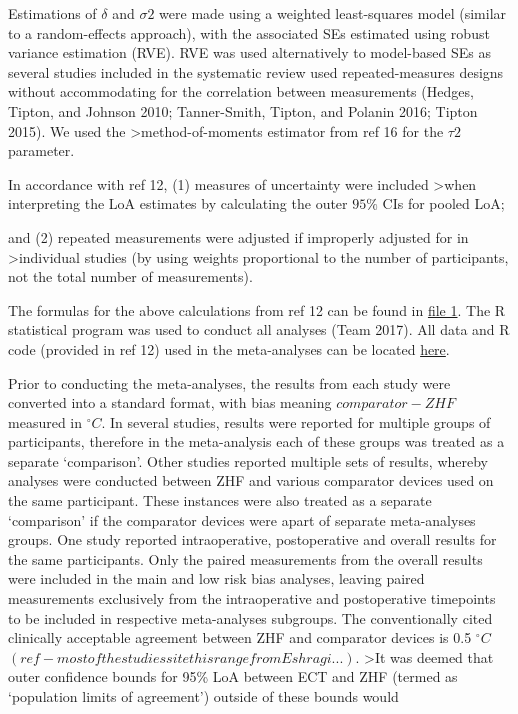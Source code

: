 \documentclass[smallextended]{svjour3}       %
\begin{document}
Estimations of \(\delta\) and \(\sigma2\) were made using a weighted
least-squares model (similar to a random-effects approach), with the
associated SEs estimated using robust variance estimation (RVE). RVE was
used alternatively to model-based SEs as several studies included in the
systematic review used repeated-measures designs without accommodating
for the correlation between measurements (Hedges, Tipton, and Johnson
2010; Tanner-Smith, Tipton, and Polanin 2016; Tipton 2015). We used the
\textgreater{}method-of-moments estimator from ref 16 for the \(\tau2\)
parameter.

In accordance with ref 12, (1) measures of uncertainty were included
\textgreater{}when interpreting the LoA estimates by calculating the
outer \(95\%\) CIs for pooled LoA;

and (2) repeated measurements were adjusted if improperly adjusted for
in \textgreater{}individual studies (by using weights proportional to
the number of participants, not the total number of measurements).

The formulas for the above calculations from ref 12 can be found in
\href{}{file 1}. The R statistical program was used to conduct all
analyses (Team 2017). All data and R code (provided in ref 12) used in
the meta-analyses can be located \href{https://doi.org}{here}.

Prior to conducting the meta-analyses, the results from each study were
converted into a standard format, with bias meaning \(comparator-ZHF\)
measured in \(^\circ C\). In several studies, results were reported for
multiple groups of participants, therefore in the meta-analysis each of
these groups was treated as a separate `comparison'. Other studies
reported multiple sets of results, whereby analyses were conducted
between ZHF and various comparator devices used on the same participant.
These instances were also treated as a separate `comparison' if the
comparator devices were apart of separate meta-analyses groups. One
study reported intraoperative, postoperative and overall results for the
same participants. Only the paired measurements from the overall results
were included in the main and low risk bias analyses, leaving paired
measurements exclusively from the intraoperative and postoperative
timepoints to be included in respective meta-analyses subgroups. The
conventionally cited clinically acceptable agreement between ZHF and
comparator devices is 0.5 \(^\circ C\)
\((ref - most of the studies site this range from Eshragi...)\).
\textgreater{}It was deemed that outer confidence bounds for 95\% LoA
between ECT and ZHF (termed as `population limits of agreement') outside
of these bounds would
\end{document}
